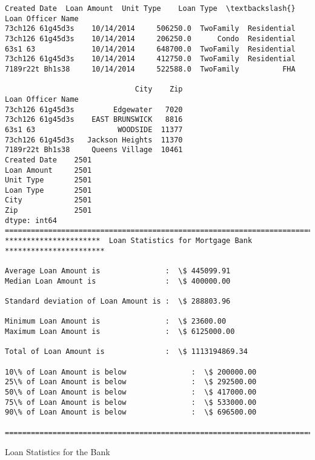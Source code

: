 \documentclass[11pt]{article}
\begin{document}
    \begin{Verbatim}[commandchars=\\\{\}]
                  Created Date  Loan Amount  Unit Type    Loan Type  \textbackslash{}
Loan Officer Name                                                     
73ch126 61g45d3s    10/14/2014     506250.0  TwoFamily  Residential   
73ch126 61g45d3s    10/14/2014     206250.0      Condo  Residential   
63s1 63             10/14/2014     648700.0  TwoFamily  Residential   
73ch126 61g45d3s    10/14/2014     412750.0  TwoFamily  Residential   
7189r22t Bh1s38     10/14/2014     522588.0  TwoFamily          FHA   

                              City    Zip  
Loan Officer Name                          
73ch126 61g45d3s         Edgewater   7020  
73ch126 61g45d3s    EAST BRUNSWICK   8816  
63s1 63                   WOODSIDE  11377  
73ch126 61g45d3s   Jackson Heights  11370  
7189r22t Bh1s38     Queens Village  10461  
Created Date    2501
Loan Amount     2501
Unit Type       2501
Loan Type       2501
City            2501
Zip             2501
dtype: int64
=======================================================================
**********************  Loan Statistics for Mortgage Bank ***********************
 
Average Loan Amount is               :  \$ 445099.91
Median Loan Amount is                :  \$ 400000.00
 
Standard deviation of Loan Amount is :  \$ 288803.96
 
Minimum Loan Amount is               :  \$ 23600.00
Maximum Loan Amount is               :  \$ 6125000.00
 
Total of Loan Amount is              :  \$ 1113194869.34
 
10\% of Loan Amount is below               :  \$ 200000.00
25\% of Loan Amount is below               :  \$ 292500.00
50\% of Loan Amount is below               :  \$ 417000.00
75\% of Loan Amount is below               :  \$ 533000.00
90\% of Loan Amount is below               :  \$ 696500.00
 
==========================================================================

    \end{Verbatim}

    Loan Statistics for the Bank
\end{document}

